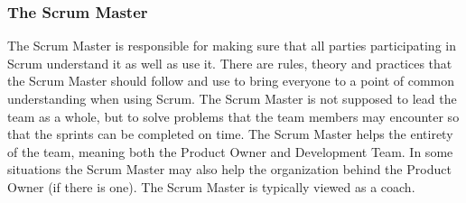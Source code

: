 \subsubsection{The Scrum Master}


The Scrum Master is responsible for making sure that all parties participating in Scrum
understand it as well as use it\cite{scrumguide11}.  There are rules, theory and practices
that the Scrum Master should follow and use to bring everyone to a point of common
understanding when using Scrum\cite{scrumguide11}. The Scrum Master is not supposed to lead
the team as a whole, but to solve problems that the team members may encounter so that the
sprints can be completed on time\cite{scrumguide11}. The Scrum Master helps the entirety of
the team, meaning both the Product Owner and Development Team\cite{scrumguide11}. In some
situations the Scrum Master may also help the organization behind the Product Owner (if
there is one). The Scrum Master is typically viewed as a coach\cite{scrumguide11}.